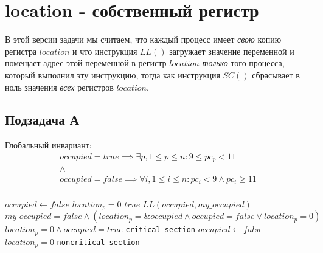 \documentclass{article}
\begin{document}
\section{location - собственный регистр}

В этой версии задачи мы считаем, что каждый процесс имеет \emph{свою} копию регистра $ location $ и что инструкция $ LL() $
загружает значение переменной и помещает адрес этой переменной в регистр $ location $ \emph{только} того процесса, который
выполнил эту инструкцию, тогда как инструкция $ SC() $ сбрасывает в ноль значения \emph{всех} регистров $ location $.

\subsection{Подзадача А}

Глобальный инвариант:
\begin{displaymath}
\begin{matrix}
occupied = true \implies \exists p, 1 \leq p \leq n : 9 \leq pc_p < 11 \\
\land \\
occupied = false \implies \forall i, 1 \leq i \leq n : pc_i < 9 \land pc_i \geq 11 \\
\end{matrix}
\end{displaymath}

\begin{algorithmic}[1]
\State $ occupied \gets false $
                         \Comment $ location_p = 0 $
        \Repeat
            \Repeat                                     \Comment $ true $
                \State $ LL(occupied, my\_occupied) $
                      \Comment $ my\_occupied = false \land (location_p = \&occupied \land
                                                                   occupied = false \lor location_p = 0) $
                \Comment $ location_p = 0 \land occupied = true $
        \State \texttt{critical section}
        \State $ occupied \gets false $                 \Comment $ location_p = 0 $
        \State \texttt{noncritical section}
    \EndWhile
\EndProcedure
\end{algorithmic}
\end{document}
